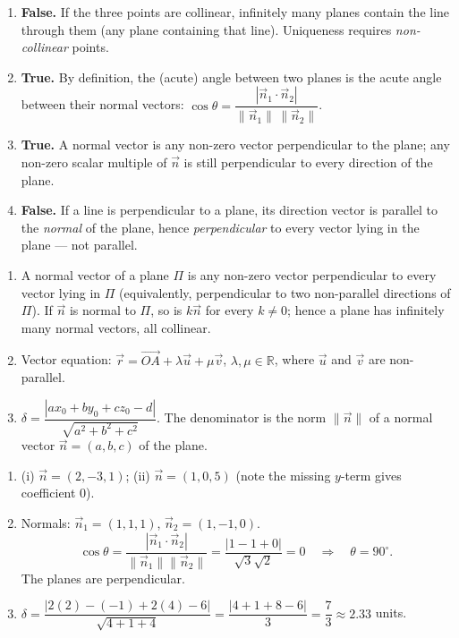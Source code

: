 \documentclass[11pt]{article}
\newcommand{\cle}[1]{{\popxbold\color{popdark}#1}}
\begin{document}
\begin{corrige}
\begin{enumerate}
\item \textbf{False.} If the three points are collinear, infinitely many planes contain the line through them (any plane containing that line). Uniqueness requires \emph{non-collinear} points.
\item \textbf{True.} By definition, the (acute) angle between two planes is the acute angle between their normal vectors: $\cos\theta=\dfrac{|\vec{n}_1\cdot\vec{n}_2|}{\|\vec{n}_1\|\,\|\vec{n}_2\|}$.
\item \textbf{True.} A normal vector is any non-zero vector perpendicular to the plane; any non-zero scalar multiple of $\vec{n}$ is still perpendicular to every direction of the plane.
\item \textbf{False.} If a line is perpendicular to a plane, its direction vector is parallel to the \emph{normal} of the plane, hence \emph{perpendicular} to every vector lying in the plane — not parallel.
\end{enumerate}
\end{corrige}

\begin{corrige}
\begin{enumerate}
\item A \cle{normal vector} of a plane $\Pi$ is any non-zero vector perpendicular to every vector lying in $\Pi$ (equivalently, perpendicular to two non-parallel directions of $\Pi$). If $\vec{n}$ is normal to $\Pi$, so is $k\vec{n}$ for every $k\neq 0$; hence a plane has infinitely many normal vectors, all collinear.
\item Vector equation: $\vec{r}=\overrightarrow{OA}+\lambda\vec{u}+\mu\vec{v}$, $\lambda,\mu\in\mathbb{R}$, where $\vec{u}$ and $\vec{v}$ are non-parallel.
\item $\delta=\dfrac{|ax_0+by_0+cz_0-d|}{\sqrt{a^2+b^2+c^2}}$. The denominator is the norm $\|\vec{n}\|$ of a normal vector $\vec{n}=(a,b,c)$ of the plane.
\end{enumerate}
\end{corrige}

\begin{corrige}
\begin{enumerate}
\item (i) $\vec{n}=(2,-3,1)$; (ii) $\vec{n}=(1,0,5)$ (note the missing $y$-term gives coefficient $0$).
\item Normals: $\vec{n}_1=(1,1,1)$, $\vec{n}_2=(1,-1,0)$.
\[
\cos\theta=\frac{|\vec{n}_1\cdot\vec{n}_2|}{\|\vec{n}_1\|\|\vec{n}_2\|}=\frac{|1-1+0|}{\sqrt{3}\sqrt{2}}=0
\quad\Longrightarrow\quad \theta=90^{\circ}.
\]
The planes are perpendicular.
\item $\delta=\dfrac{|2(2)-(-1)+2(4)-6|}{\sqrt{4+1+4}}=\dfrac{|4+1+8-6|}{3}=\dfrac{7}{3}\approx 2.33$ units.
\end{enumerate}
\end{corrige}
\end{document}
